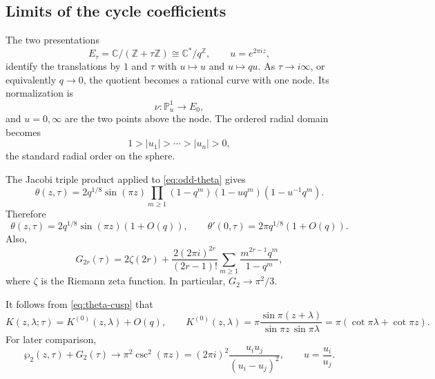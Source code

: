 \documentclass[11pt,a4paper]{amsart}
\numberwithin{equation}{section}
\theoremstyle{definition}
\theoremstyle{remark}
\newcommand{\CC}{\mathbb C}
\newcommand{\ZZ}{\mathbb Z}
\newcommand{\ii}{i}
\newcommand{\e}{e}
\begin{document}
\subsection{Limits of the cycle coefficients}
The two presentations
\begin{equation*}
 E_\tau=\CC/(\ZZ+\tau\ZZ)\cong\CC^*/q^\ZZ,
 \qquad u=\e^{2\pi\ii z},
\end{equation*}
identify the translations by $1$ and $\tau$ with $u\mapsto u$ and
$u\mapsto qu$.  As $\tau\to\ii\infty$, or equivalently $q\to 0$, the quotient becomes a rational curve with one node.  Its normalization is
\begin{equation*}
 \nu:\mathbb P^1_u\longrightarrow E_0,
\end{equation*}
and $u=0,\infty$ are the two points above the node.  The ordered radial domain becomes
\begin{equation}
 1>|u_1|>\cdots>|u_n|>0,
 \label{eq:plane-radial-chamber}
\end{equation}
the standard radial order on the sphere.

The Jacobi triple product applied to \eqref{eq:odd-theta} gives
\begin{equation}
 \theta(z,\tau)=2q^{1/8}\sin(\pi z)
 \prod_{m\geq1}(1-q^m)(1-uq^m)(1-u^{-1}q^m).
 \label{eq:theta-product-cusp}
\end{equation}
Therefore
\begin{equation}
 \theta(z,\tau)=2q^{1/8}\sin(\pi z)(1+O(q)),
 \qquad
 \theta'(0,\tau)=2\pi q^{1/8}(1+O(q)).
 \label{eq:theta-cusp}
\end{equation}
Also,
\begin{equation*}
 G_{2r}(\tau)
 =2\zeta(2r)
 +\frac{2(2\pi\ii)^{2r}}{(2r-1)!}
 \sum_{m\geq1}\frac{m^{2r-1}q^m}{1-q^m},
\end{equation*}
where $\zeta$ is the Riemann zeta function.  In particular,
$G_2\to\pi^2/3$.

It follows from \eqref{eq:theta-cusp} that
\begin{equation}
 K(z,\lambda;\tau)=K^{(0)}(z,\lambda)+O(q),
 \qquad
 K^{(0)}(z,\lambda)
 =\pi\frac{\sin\pi(z+\lambda)}
 {\sin\pi z\,\sin\pi\lambda}
 =\pi(\cot\pi\lambda+\cot\pi z).
 \label{eq:K0}
\end{equation}
For later comparison,
\begin{equation}
 \wp_2(z,\tau)+G_2(\tau)\longrightarrow
 \pi^2\csc^2(\pi z)
 =(2\pi\ii)^2\frac{u_i u_j}{(u_i-u_j)^2},
 \qquad u=\frac{u_i}{u_j}.
 \label{eq:P2-cusp}
\end{equation}
\end{document}
